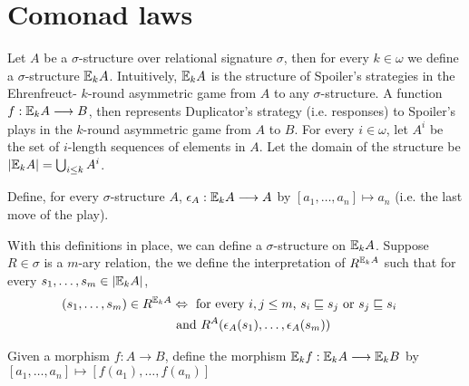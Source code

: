 \section{Comonad laws}
Let $A$ be a $\sigma$-structure over relational signature $\sigma$, then for every $k \in \omega$ we define a $\sigma$-structure ${\mathbb{E}_{k}A}$. Intuitively, ${\mathbb{E}_{k}A}$ is the structure of Spoiler's strategies in the Ehrenfreuct-{\Fraisse} $k$-round asymmetric game from $A$ to any $\sigma$-structure. A function $f:{\mathbb{E}_{k}A} \longrightarrow B$, then represents Duplicator's strategy (i.e. responses) to Spoiler's plays in the $k$-round asymmetric game from $A$ to $B$. For every $i \in \omega$, let $A^{i}$ be the set of $i$-length sequences of elements in $A$. Let the domain of the structure be $|{\mathbb{E}_{k}A}| = \bigcup_{i \leq k} A^{i}$. 
\begin{defn}
Define, for every $\sigma$-structure $A$, $\epsilon_{A}:{\mathbb{E}_{k}A} \longrightarrow A$ by $[a_{1},\dots,a_{n}] \mapsto a_{n}$ (i.e. the last move of the play). 
\label{defn:epsilon}
\end{defn}
With this definitions in place, we can define a $\sigma$-structure on ${\mathbb{E}_{k}A}$. Suppose $R \in \sigma$ is a $m$-ary relation, the we define the interpretation of $R^{{\mathbb{E}_{k}A}}$ such that for every $s_{1},\dots,s_{m} \in |{\mathbb{E}_{k}A}|$,
\begin{align}
(s_{1},\dots,s_{m}) \in R^{{\mathbb{E}_{k}A}} &\Leftrightarrow \text{ for every $i,j \leq m$, } s_{i} \sqsubseteq s_{j} \text{ or } s_{j} \sqsubseteq s_{i} & \label{eq:R1st} \\ 
&\text{ and } R^{A}(\epsilon_{A}(s_{1}),\dots,\epsilon_{A}(s_{m})) & \label{eq:R2nd}
\end{align}
\begin{defn}
Given a morphism $f:A \longrightarrow B$, define the morphism ${\mathbb{E}_{k}f}:{\mathbb{E}_{k}A} \longrightarrow {\mathbb{E}_{k}B}$ by $[a_{1},\dots,a_{n}] \mapsto [f(a_{1}),\dots,f(a_{n})]$
\label{defn:efComonadMorphism}
\end{defn}

